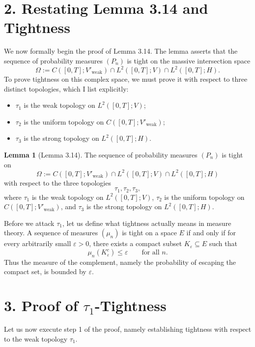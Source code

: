 \documentclass[11pt]{article}
\theoremstyle{definition}
\newtheorem{lemma}{Lemma}
\theoremstyle{remark}
\begin{document}
\section*{2. Restating Lemma 3.14 and Tightness}
We now formally begin the proof of Lemma 3.14. The lemma asserts that the sequence of probability measures $(P_n)$ is tight on the massive intersection space
\[
  \Omega:=C([0,T];V'_{\mathrm{weak}})\cap L^2([0,T];V)\cap L^2([0,T];H).
\]
To prove tightness on this complex space, we must prove it with respect to three distinct topologies, which I list explicitly:
\begin{itemize}
\item $\tau_1$ is the weak topology on $L^2([0,T];V)$;
\item $\tau_2$ is the uniform topology on $C([0,T];V'_{\mathrm{weak}})$;
\item $\tau_3$ is the strong topology on $L^2([0,T];H)$.
\end{itemize}

\begin{lemma}[Lemma 3.14]
The sequence of probability measures $(P_n)$ is tight on
\[
  \Omega:=C([0,T];V'_{\mathrm{weak}})\cap L^2([0,T];V)\cap L^2([0,T];H)
\]
with respect to the three topologies
\[
  \tau_1,\tau_2,\tau_3,
\]
where $\tau_1$ is the weak topology on $L^2([0,T];V)$, $\tau_2$ is the uniform topology on $C([0,T];V'_{\mathrm{weak}})$, and $\tau_3$ is the strong topology on $L^2([0,T];H)$.
\end{lemma}

Before we attack $\tau_1$, let us define what tightness actually means in measure theory. A sequence of measures $(\mu_n)$ is tight on a space $E$ if and only if for every arbitrarily small $\varepsilon>0$, there exists a compact subset $K_\varepsilon\subseteq E$ such that
\[
  \mu_n(K_\varepsilon^c)\le \varepsilon
  \qquad \text{for all } n.
\]
Thus the measure of the complement, namely the probability of escaping the compact set, is bounded by $\varepsilon$.

\section*{3. Proof of $\tau_1$-Tightness}
Let us now execute step 1 of the proof, namely establishing tightness with respect to the weak topology $\tau_1$.
\end{document}
